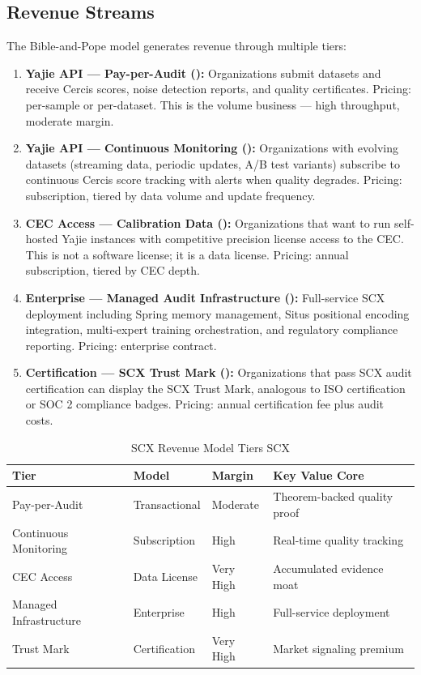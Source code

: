 \documentclass[12pt,a4paper]{article}
\theoremstyle{remark}
\begin{document}
\subsection{Revenue Streams}
The Bible-and-Pope model generates revenue through multiple tiers:
\begin{enumerate}[label=\textbf{Tier \arabic*}, leftmargin=*]
 \item \textbf{Yajie API --- Pay-per-Audit ():} Organizations submit 
 datasets and receive Cercis scores, noise detection reports, and 
 quality certificates. Pricing: per-sample or per-dataset. This is 
 the volume business --- high throughput, moderate margin.
 \item \textbf{Yajie API --- Continuous Monitoring ():} Organizations 
 with evolving datasets (streaming data, periodic updates, A/B test 
 variants) subscribe to continuous Cercis score tracking with alerts 
 when quality degrades. Pricing: subscription, tiered by data volume 
 and update frequency.
 \item \textbf{CEC Access --- Calibration Data ():} Organizations that 
 want to run self-hosted Yajie instances with competitive precision 
 license access to the CEC. This is not a software license; it is a 
 data license. Pricing: annual subscription, tiered by CEC depth.
 \item \textbf{Enterprise --- Managed Audit Infrastructure ():} 
 Full-service SCX deployment including Spring memory management, 
 Situs positional encoding integration, multi-expert training 
 orchestration, and regulatory compliance reporting. Pricing: 
 enterprise contract.
 \item \textbf{Certification --- SCX Trust Mark ():} Organizations 
 that pass SCX audit certification can display the SCX Trust Mark, 
 analogous to ISO certification or SOC 2 compliance badges. Pricing: 
 annual certification fee plus audit costs.
\end{enumerate}
\begin{table}[H]
\centering
\caption{SCX Revenue Model Tiers SCX}
\begin{tabular}{@{}p{3cm} p{2.5cm} p{2.5cm} p{5cm}@{}}
\toprule
\textbf{Tier } & \textbf{Model } & \textbf{Margin } & \textbf{Key Value Core} \\
\midrule
Pay-per-Audit & Transactional & Moderate & Theorem-backed quality proof \\
Continuous Monitoring & Subscription & High & Real-time quality tracking \\
CEC Access & Data License & Very High & Accumulated evidence moat \\
Managed Infrastructure & Enterprise & High & Full-service deployment \\
Trust Mark & Certification & Very High & Market signaling premium \\
\bottomrule
\end{tabular}
\end{table}
\end{document}
